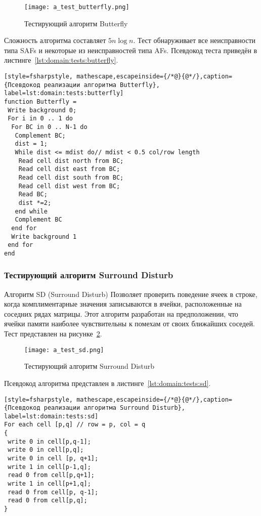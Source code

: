 \begin{figure}[ht]
\centering
  \texttt{[image: a\_test\_butterfly.png]}  
  \caption{Тестирующий алгоритм Butterfly}
  \label{fig:domain:tests:butterfly}
\end{figure} 

Сложность алгоритма составляет $ 5n \log n $. Тест обнаруживает все неисправности типа SAFs и некоторые из неисправностей типа AFs. Псевдокод теста приведён в листинге~\ref{lst:domain:tests:butterfly}.

\begin{lstlisting}[style=fsharpstyle, mathescape,escapeinside={/*@}{@*/},caption={Псевдокод реализации алгоритма Butterfly}, label=lst:domain:tests:butterfly]
function Butterfly =
 Write background 0;
 For i in 0 .. 1 do
  For BC in 0 .. N-1 do
   Complement BC;
   dist = 1; 
   While dist <= mdist do// mdist < 0.5 col/row length
    Read cell dist north from BC;
    Read cell dist east from BC;
    Read cell dist south from BC;
    Read cell dist west from BC;
    Read BC; 
    dist *=2;
   end while
   Complement BC
  end for
  Write background 1
 end for
end
\end{lstlisting}

\subsubsection{Тестирующий алгоритм Surround Disturb}
\label{sub:domain:tests:sd}
Алгоритм SD (Surround Disturb) Позволяет проверить поведение ячеек в строке, когда комплиментарные значения записываются в ячейки, расположенные на соседних рядах матрицы. Этот алгоритм разработан на предположении, что ячейки памяти наиболее чувствительны к помехам от своих ближайших соседей. Тест представлен на рисунке~\ref{fig:domain:tests:sd}. 

\begin{figure}[ht]
\centering
  \texttt{[image: a\_test\_sd.png]}  
  \caption{Тестирующий алгоритм Surround Disturb}
  \label{fig:domain:tests:sd}
\end{figure} 

Псевдокод алгоритма представлен в листинге~\ref{lst:domain:tests:sd}.

\begin{lstlisting}[style=fsharpstyle, mathescape,escapeinside={/*@}{@*/},caption={Псевдокод реализации алгоритма Surround Disturb}, label=lst:domain:tests:sd]
For each cell [p,q] // row = p, col = q
{
 write 0 in cell[p,q-1];
 write 0 in cell[p,q];
 write 0 in cell [p, q+1];
 write 1 in cell[p-1,q];
 read 0 from cell[p,q+1];
 write 1 in cell[p+1,q];
 read 0 from cell[p, q-1];
 read 0 from cell[p,q];
}
\end{lstlisting}

